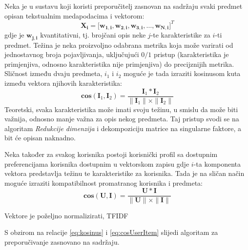 \documentclass[times, utf8, diplomski, numeric]{fer}
\begin{document}
Neka je u sustavu koji koristi preporučitelj zasnovan na sadržaju svaki predmet
opisan tekstualnim medapodacima i vektorom:
\begin{equation}
\label{eq:vektorKarakteristika}
	\boldsymbol{X_i} = 
		\big[ 
			\boldsymbol{w_{1,i}}, 
			\boldsymbol{w_{2,i}}, 
			\boldsymbol{w_{3,i}}, 
			\ldots, 
			\boldsymbol{w_{N,i}} 
		\big]^T
\end{equation}
gdje je $\boldsymbol{w_{j,i}}$ kvantitativni, tj. brojčani opis neke $j$-te
karakteristike za $i$-ti predmet. Težina je neka proizvoljno odabrana metrika
koja može varirati od jednostavnog broja pojavljivanja, uključujući $0/1$
pristup (karakteristika je primjenjiva, odnosno karakteristika nije
primjenjiva) do precijznijih metrika. Sličnost između dvaju predmeta, $i_1$ i
$i_2$ moguće je tada izraziti kosinusom kuta između vektora njihovih
karakteristika:
\begin{equation}
\label{eq:kosinus}
	\boldsymbol{cos}(\boldsymbol{I}_1, \boldsymbol{I}_2) = 
		\frac
			{\boldsymbol{I}_1 \ast \boldsymbol{I}_2}
			{\|\boldsymbol{I}_1\| \times \|\boldsymbol{I}_2\|}
\end{equation}
Teoretski, svaka karakteristika može imati svoju težinu, u smislu da može biti
važnija, odnosno manje važna za opis nekog predmeta. Taj pristup svodi se na
algoritam \emph{Redukcije dimenzija} i dekompoziciju matrice na singularne
faktore, a bit će opisan naknadno.

Neka također za svakog korisnika postoji korisnički profil sa dostupnim
preferencijama korisnika dostupnim u vektorskom zapisu gdje $i$-ta komponenta
vektora predstavlja težinu te karakteristike za korisnika. Tada je na sličan
način moguće izraziti kompatibilnost promatranog korisnika i predmeta:
\begin{equation}
\label{eq:cosUserItem}
	\boldsymbol{cos}(\boldsymbol{U}, \boldsymbol{I}) = 
		\frac
			{\boldsymbol{U} \ast \boldsymbol{I}}
			{\|\boldsymbol{U}\| \times \|\boldsymbol{I}\|}
\end{equation}


Vektore je poželjno normalizirati, TFIDF

S obzirom na relacije \ref{eq:kosinus} i \ref{eq:cosUserItem} slijedi algoritam
za preporučivanje zasnovano na sadržaju.
\end{document}
